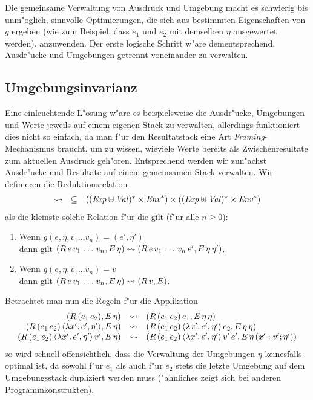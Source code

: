 \documentclass[12pt,a4paper]{article}
\begin{document}
Die gemeinsame Verwaltung von Ausdruck und Umgebung macht es schwierig bis unm"oglich, sinnvolle Optimierungen,
die sich aus bestimmten Eigenschaften von $g$ ergeben (wie zum Beispiel, dass $e_1$ und $e_2$ mit demselben
$\eta$ ausgewertet werden), anzuwenden. Der erste logische Schritt w"are dementsprechend, Ausdr"ucke und
Umgebungen getrennt voneinander zu verwalten.


\subsection{Umgebungsinvarianz}

Eine einleuchtende L"osung w"are es beispielsweise die Ausdr"ucke, Umgebungen und Werte jeweils auf einem
eigenen Stack zu verwalten, allerdings funktioniert dies nicht so einfach, da man f"ur den Resultatstack eine
Art \emph{Framing}-Mechanismus braucht, um zu wissen, wieviele Werte bereits als Zwischenresultate zum
aktuellen Ausdruck geh"oren. Entsprechend werden wir zun"achst Ausdr"ucke und Resultate auf einem gemeinsamen
Stack verwalten. Wir definieren die Reduktionsrelation
\[\begin{array}{rcl}
  \rightsquigarrow & \subseteq & ((\mathit{Exp} \uplus \mathit{Val})^* \times \mathit{Env}^*) \times ((\mathit{Exp} \uplus \mathit{Val})^* \times \mathit{Env}^*)
\end{array}\]
als die kleinste solche Relation f"ur die gilt (f"ur alle $n \ge 0$):
\begin{enumerate}
\item Wenn $g(e,\eta,v_1 \ldots v_n) = (e',\eta')$ \\
  dann gilt $(R\,e\,v_1\,\ldots\,v_n,E\,\eta) \rightsquigarrow (R\,e\,v_1\,\ldots\,v_n\,e',E\,\eta\,\eta')$.
\item Wenn $g(e,\eta,v_1 \ldots v_n) = v$ \\
  dann gilt $(R\,e\,v_1\,\ldots\,v_n,E\,\eta) \rightsquigarrow (R\,v,E)$.
\end{enumerate}
Betrachtet man nun die Regeln f"ur die Applikation
\[\begin{array}{rcl}
  (R\,({e_1}\,{e_2}),E\,\eta)
  &\rightsquigarrow& (R\,({e_1}\,{e_2})\,e_1,E\,\eta\,\eta) \\
  (R\,({e_1}\,{e_2})\,\langle{\lambda{x'}.\,{e'}},{\eta'}\rangle,E\,\eta)
  &\rightsquigarrow& (R\,({e_1}\,{e_2})\,\langle{\lambda{x'}.\,{e'}},{\eta'}\rangle\,e_2,E\,\eta\,\eta) \\
  (R\,({e_1}\,{e_2})\,\langle{\lambda{x'}.\,{e'}},{\eta'}\rangle\,v',E\,\eta)
  &\rightsquigarrow& (R\,({e_1}\,{e_2})\,\langle{\lambda{x'}.\,{e'}},{\eta'}\rangle\,v'\,e',E\,\eta\,(x':v';\eta')) \\
\end{array}\]
so wird schnell offensichtlich, dass die Verwaltung der Umgebungen $\eta$ keinesfalls optimal ist,
da sowohl f"ur $e_1$ als auch f"ur $e_2$ stets die letzte Umgebung auf dem Umgebungsstack dupliziert
werden muss ("ahnliches zeigt sich bei anderen Programmkonstrukten).
\end{document}
